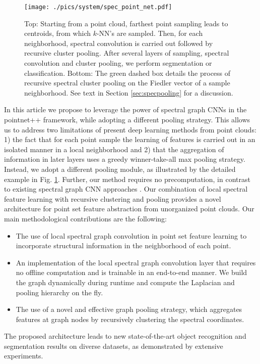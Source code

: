 \documentclass[runningheads]{llncs}
\begin{document}
\begin{figure}[!t]
  \vspace{0.3cm}
  \centerline{
  \texttt{[image: ./pics/system/spec\_point\_net.pdf]}
  }
  \vspace{0.1cm}
  \caption{{\sc Top:} Starting from a point cloud, farthest point sampling leads to centroids, from which $k$-NN's are sampled. Then, for each neighborhood, spectral convolution is carried out followed by recursive cluster pooling. 
After several layers of sampling, spectral convolution and cluster pooling, we perform segmentation or classification.
{\sc Bottom:} The green dashed box details the process of recursive spectral cluster pooling on the Fiedler vector of a sample neighborhood. See text in Section \ref{sec:specpooling} for a discussion.
}
\label{fig:spectralpooling}
\end{figure}


In this article we propose to leverage the power of spectral graph CNNs in the pointnet++ framework, while adopting a different pooling strategy. This allows us to address two limitations of present deep learning methods from point clouds: 1) the fact that for each point sample the learning of features is carried out in an isolated manner in a local neighborhood and 2) that the aggregation of information in later layers uses a greedy winner-take-all max pooling strategy. Instead, we adopt a different pooling module, as illustrated by the detailed example in Fig. \ref{fig:spectralpooling}. 
Further, our method requires no precomputation, in contrast to existing spectral graph CNN approaches \cite{defferrard2016convolutional,kipf2016semi}. Our combination of local spectral feature learning with recursive clustering and pooling provides a novel architecture for point set feature abstraction from unorganized point clouds. Our main methodological contributions are the following:
\begin{itemize}
\item The use of local spectral graph convolution in point set feature learning to incorporate structural information in the neighborhood of each point.
\item An implementation of the local spectral graph convolution layer that requires no offline computation and is trainable in an end-to-end manner. We build the graph dynamically during runtime and compute the Laplacian and pooling hierarchy on the fly. 
\item The use of a novel and effective graph pooling strategy, which aggregates features at graph nodes by recursively clustering the spectral coordinates. 
\end{itemize}
The proposed architecture leads to new state-of-the-art object recognition and segmentation results on diverse datasets, as demonstrated by extensive experiments.
\end{document}
